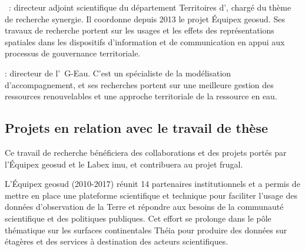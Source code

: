  : directeur adjoint scientifique du département Territoires d'{\IRSTEA}, chargé du thème de recherche {\sc synergie}.
Il coordonne depuis 2013 le projet Équipex {\sc geosud}. Ses travaux de recherche portent sur les usages et les effets
des représentations spatiales dans les dispositifs d'information et de communication en appui aux processus de gouvernance territoriale.

 : directeur de l'{\UMR\ G-Eau}.
C'est un spécialiste de la modélisation d'accompagnement,
et ses recherches portent sur une meilleure gestion des ressources renouvelables
et une approche territoriale de la ressource en eau.


\subsection{Projets en relation avec le travail de thèse}


Ce travail de recherche bénéficiera des collaborations et des projets portés
par l'Équipex {\sc geosud} et le Labex {\sc imu},
et contribuera au projet {\sc frugal}.

L'Équipex {\sc geosud} (2010-2017) réunit 14 partenaires institutionnels et a permis de mettre en place une plateforme
scientifique et technique pour faciliter l'usage des données d'observation de la Terre et répondre aux besoins
de la communauté scientifique et des politiques publiques.
Cet effort se prolonge dans le pôle thématique sur les surfaces continentales Théia
pour produire des données sur étagères et des services à destination des acteurs scientifiques.

